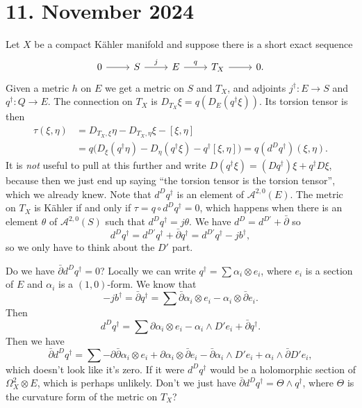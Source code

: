 \documentclass[11pt]{amsart}
\theoremstyle{definition}
\newcommand{\cc}[1]{\mathcal{#1}}
\begin{document}
\section{11. November 2024}

Let $X$ be a compact K\"ahler manifold and suppose there is a short exact sequence
\[
\begin{tikzcd}
0 \ar[r] &
S \ar[r,"j"] &
E \ar[r,"q"] &
T_X \ar[r] &
0.
\end{tikzcd}
\]
Given a metric $h$ on $E$ we get a metric on $S$ and $T_X$, and adjoints $j^\dagger : E \to S$ and $q^\dagger : Q \to E$.
The connection on $T_X$ is $D_{T_X} \xi = q(D_E(q^\dagger \xi))$.
Its torsion tensor is then
\begin{align*}
\tau(\xi, \eta)
&= D_{T_X,\xi} \eta - D_{T_X,\eta} \xi - [\xi, \eta]
\\
&= q\bigl(
D_\xi (q^\dagger \eta) - D_\eta (q^\dagger \xi) - q^\dagger [\xi, \eta]
\bigr)
= q(d^D q^\dagger)(\xi, \eta).
\end{align*}
It is \emph{not} useful to pull at this further and write $D(q^\dagger \xi) = (Dq^\dagger) \xi + q^\dagger D\xi$, because then we just end up saying ``the torsion tensor is the torsion tensor'', which we already knew.
Note that $d^D q^\dagger$ is an element of $\cc A^{2,0}(E)$.
The metric on $T_X$ is K\"ahler if and only if $\tau = q \circ d^D q^\dagger = 0$, which happens when there is an element $\theta$ of $\cc A^{2,0}(S)$ such that $d^D q^\dagger = j \theta$.
We have $d^D = d^{D'} + \bar\partial$ so
\[
d^D q^\dagger
= d^{D'} q^\dagger + \bar\partial q^\dagger
= d^{D'} q^\dagger - j b^\dagger,
\]
so we only have to think about the $D'$ part.


Do we have $\bar\partial d^D q^\dagger = 0$?
Locally we can write $q^\dagger = \sum \alpha_i \otimes e_i$, where $e_i$ is a section of $E$ and $\alpha_i$ is a $(1,0)$-form.
We know that
\[
-jb^\dagger
= \bar\partial q^\dagger
= \sum \bar\partial \alpha_i \otimes e_i
- \alpha_i \otimes \bar\partial e_i.
\]
Then
\[
d^D q^\dagger
= \sum \partial \alpha_i \otimes e_i 
- \alpha_i \wedge D' e_i
+ \bar\partial q^\dagger.
\]
Then we have
\[
\bar\partial d^D q^\dagger
= \sum - \partial\bar\partial \alpha_i \otimes e_i
+ \partial \alpha_i \otimes \bar\partial e_i
- \bar\partial \alpha_i \wedge D'e_i
+ \alpha_i \wedge \bar\partial D'e_i,
\]
which doesn't look like it's zero.
If it were $d^D q^\dagger$ would be a holomorphic section of $\Omega^2_X \otimes E$, which is perhaps unlikely.
Don't we just have $\bar\partial d^D q^\dagger = \Theta \wedge q^\dagger$, where $\Theta$ is the curvature form of the metric on $T_X$?
\end{document}
